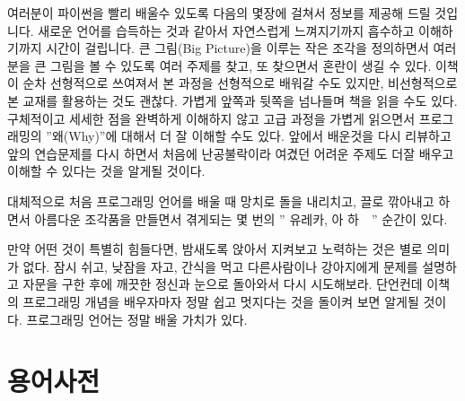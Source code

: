 여러분이 파이썬을 빨리 배울수 있도록 다음의 몇장에 걸쳐서 정보를 제공해 드릴 것입니다. 새로운 언어를 습득하는 것과 같아서 자연스럽게 느껴지기까지 흡수하고 이해하기까지 시간이 걸립니다. 큰 그림(Big Picture)을 이루는 작은 조각을 정의하면서 여러분을 큰 그림을 볼 수 있도록 여러 주제를 찾고, 또 찾으면서 혼란이 생길 수 있다. 이책이 순차 선형적으로 쓰여져서 본 과정을 선형적으로 배워갈 수도 있지만, 비선형적으로 본 교재를 활용하는 것도 괜찮다. 가볍게 앞쪽과 뒷쪽을 넘나들며 책을 읽을 수도 있다. 구체적이고 세세한 점을 완벽하게 이해하지 않고 고급 과정을 가볍게 읽으면서 프로그래밍의 ''왜(Why)''에 대해서 더 잘 이해할 수도 있다. 앞에서 배운것을 다시 리뷰하고 앞의 연습문제를 다시 하면서 처음에 난공불락이라 여겼던 어려운 주제도 더잘 배우고 이해할 수 있다는 것을 알게될 것이다.

대체적으로 처음 프로그래밍 언어를 배울 때 망치로 돌을 내리치고, 끌로 깎아내고 하면서 아름다운 조각품을 만들면서 겪게되는 몇 번의 '' 유레카, 아 하~~'' 순간이 있다.

만약 어떤 것이 특별히 힘들다면, 밤새도록 앉아서 지켜보고 노력하는 것은 별로 의미가 없다. 잠시 쉬고, 낮잠을 자고, 간식을 먹고 다른사람이나 강아지에게 문제를 설명하고 자문을 구한 후에 깨끗한 정신과 눈으로 돌아와서 다시 시도해보라. 단언컨데 이책의 프로그래밍 개념을 배우자마자 정말 쉽고 멋지다는 것을 돌이켜 보면 알게될 것이다. 프로그래밍 언어는 정말 배울 가치가 있다.

\section{용어사전}

